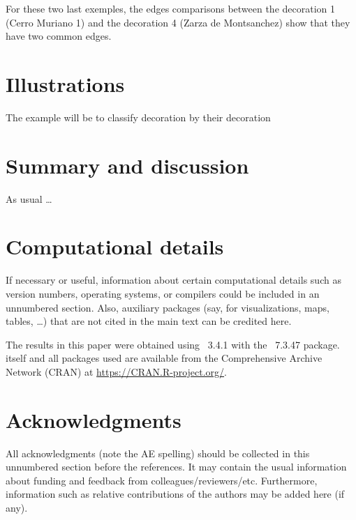 \documentclass[article]{jss}
\begin{document}
For these two last exemples, the edges comparisons between the decoration 1 (Cerro Muriano 1) and the decoration 4 (Zarza de Montsanchez) show that they have two common edges.


\section{Illustrations} \label{sec:illustrations}

The example will be to classify decoration by their decoration


\section{Summary and discussion} \label{sec:summary}

\begin{leftbar}
As usual \dots
\end{leftbar}





\section*{Computational details}

\begin{leftbar}
If necessary or useful, information about certain computational details
such as version numbers, operating systems, or compilers could be included
in an unnumbered section. Also, auxiliary packages (say, for visualizations,
maps, tables, \dots) that are not cited in the main text can be credited here.
\end{leftbar}

The results in this paper were obtained using
~3.4.1 with the
~7.3.47 package.  itself
and all packages used are available from the Comprehensive
 Archive Network (CRAN) at
\url{https://CRAN.R-project.org/}.


\section*{Acknowledgments}

\begin{leftbar}
All acknowledgments (note the AE spelling) should be collected in this
unnumbered section before the references. It may contain the usual information
about funding and feedback from colleagues/reviewers/etc. Furthermore,
information such as relative contributions of the authors may be added here
(if any).
\end{leftbar}
\end{document}
